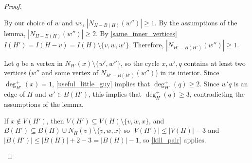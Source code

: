 \documentclass{article}
\theoremstyle{definition}
\begin{document}
\begin{proof}
\begin{compactenum}[(i)]
\begin{compactenum}
      By our choice of $w$ and $uv$, $|N_{H-B(H)}(w'')|\ge 1$.  By the assumptions of the lemma, $|N_{H-B(H)}(w'')|\ge 2$.  By \cref{same_inner_vertices} $I(H')=I(H-v)=I(H)\setminus\{v,w,w'\}$. Therefore, $|N_{H'-B(H')}(w'')|\ge 1$.

      Let $q$ be a vertex in $N_{H'}(x)\setminus\{w',w''\}$, so the cycle $x,w',q$ contains at least two vertices ($w''$ and some vertex of $N_{H'-B(H')}(w'')$) in its interior. Since $\deg^+_{H'}(x)=1$, \cref{useful_little_guy} implies that $\deg^+_{H'}(q)\ge 2$.  Since $w'q$ is an edge of $H$ and $w'\in B(H')$, this implies that $\deg^+_H(q)\ge 3$, contradicting the assumptions of the lemma.

      \item If $x\not\in V(H')$, then $V(H')\subseteq V(H)\setminus\{v,w,x\}$, and $B(H')\subseteq B(H)\cup N_H(v)\setminus\{v,w,x\}$ so $|V(H')|\le |V(H)|-3$ and $|B(H')|\le|B(H)|+2-3=|B(H)|-1$, so \cref{kill_pair} applies. \qedhere
    \end{compactenum}

\end{compactenum}
\end{proof}
\end{document}

